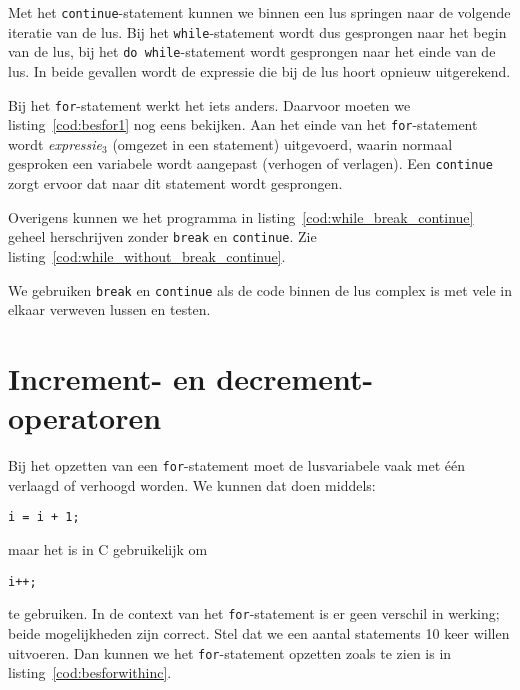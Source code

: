 Met het \texttt{continue}-statement kunnen we binnen een lus springen naar de volgende iteratie van de lus. Bij het \texttt{while}-statement wordt dus gesprongen naar het begin van de lus, bij het \texttt{do while}-statement wordt gesprongen naar het einde van de lus. In beide gevallen wordt de expressie die bij de lus hoort opnieuw uitgerekend.

Bij het \texttt{for}-statement werkt het iets anders. Daarvoor moeten we listing~\ref{cod:besfor1} nog eens bekijken. Aan het einde van het \texttt{for}-statement wordt \textsl{expressie$_3$} (omgezet in een statement) uitgevoerd, waarin normaal gesproken een variabele wordt aangepast (verhogen of verlagen). Een \texttt{continue} zorgt ervoor dat naar dit statement wordt gesprongen.


Overigens kunnen we het programma in listing~\ref{cod:while_break_continue} geheel herschrijven zonder \texttt{break} en \texttt{continue}. Zie listing~\ref{cod:while_without_break_continue}.


We gebruiken \texttt{break} en \texttt{continue} als de code binnen de lus complex is met vele in elkaar verweven lussen en testen.


\section{Increment- en decrement-operatoren}
Bij het opzetten van een \texttt{for}-statement moet de lusvariabele vaak met één verlaagd of verhoogd worden. We kunnen dat doen middels:

\hspace*{1em}\texttt{i = i + 1;}

maar het is in C gebruikelijk om

\hspace*{1em}\texttt{i++;}

te gebruiken. In de context van het \texttt{for}-statement is er geen verschil in werking; beide mogelijkheden zijn correct. Stel dat we een aantal statements 10 keer willen uitvoeren. Dan kunnen we het \texttt{for}-statement opzetten zoals te zien is in listing~\ref{cod:besforwithinc}.

